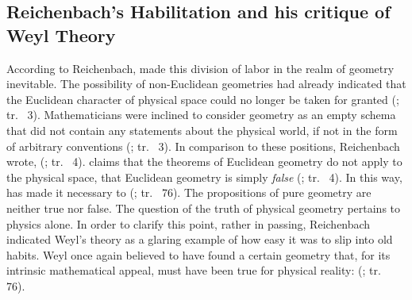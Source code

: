 \documentclass[draft]{article}
\newcommand{\WT}{Weyl's theory\xspace}
\newcommand{\rhp}[2]{(\cite[#1]{Reichenbach1920a}; tr.\ \citeyear{Reichenbach1969} #2)\xspace}
\begin{document}





\subsection{Reichenbach's Habilitation and his critique of Weyl Theory}

According to Reichenbach, \rt made this division of labor in the realm of geometry inevitable. The possibility of non-Euclidean geometries had already indicated that the  Euclidean character of physical space could no longer be taken for granted \rhp{3}{3}. Mathematicians were inclined to consider geometry as an empty schema that did not contain any statements about the physical world, if not in the form of arbitrary conventions \rhp{3}{3}. In comparison to these positions, Reichenbach wrote,  \rhp{3}{4}. \Rt claims that the theorems of Euclidean geometry do not apply to the physical space, that Euclidean geometry is simply \emph{false} \rhp{3}{4}. In this way, \rt has made it necessary to  \rhp{73}{76}. The propositions of pure geometry are neither true nor false. The question of the truth of physical geometry pertains to physics alone. In order to clarify this point, rather in passing, Reichenbach indicated \WT as a glaring example of how easy it was to slip into old habits. Weyl once again believed to have found a certain geometry that, for its intrinsic mathematical appeal, must have been true for physical reality:  \rhp{73}{76}.
\end{document}
